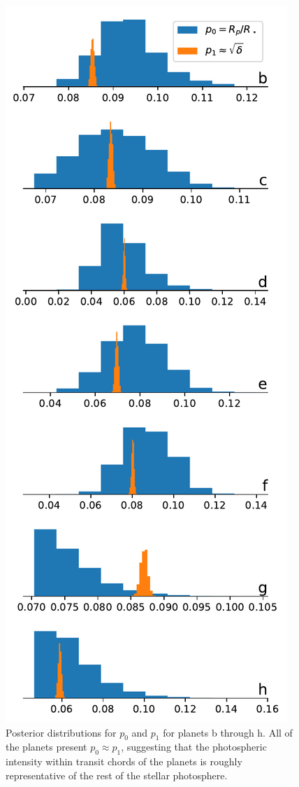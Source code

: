 \begin{figure}[H]
    \centering
    \includegraphics[scale=0.8]{trappist1_robin/posteriors.pdf}
    \caption{Posterior distributions for $p_0$ and $p_1$ for planets b through h. All of the planets present $p_0 \approx p_1$, suggesting that the photospheric intensity within transit chords of the planets is roughly representative of the rest of the stellar photosphere.}
    \label{fig:posteriors}
\end{figure}

